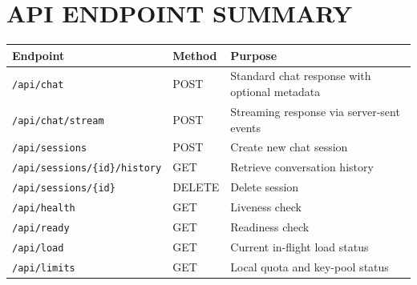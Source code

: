 \documentclass[12pt,a4paper]{report}
\begin{document}
\chapter{API ENDPOINT SUMMARY}
\begin{longtable}{|p{4cm}|p{2cm}|p{8cm}|}
\hline
\textbf{Endpoint} & \textbf{Method} & \textbf{Purpose} \\
\hline
\texttt{/api/chat} & POST & Standard chat response with optional metadata \\
\hline
\texttt{/api/chat/stream} & POST & Streaming response via server-sent events \\
\hline
\texttt{/api/sessions} & POST & Create new chat session \\
\hline
\texttt{/api/sessions/\{id\}/history} & GET & Retrieve conversation history \\
\hline
\texttt{/api/sessions/\{id\}} & DELETE & Delete session \\
\hline
\texttt{/api/health} & GET & Liveness check \\
\hline
\texttt{/api/ready} & GET & Readiness check \\
\hline
\texttt{/api/load} & GET & Current in-flight load status \\
\hline
\texttt{/api/limits} & GET & Local quota and key-pool status \\
\hline
\end{longtable}
\end{document}
